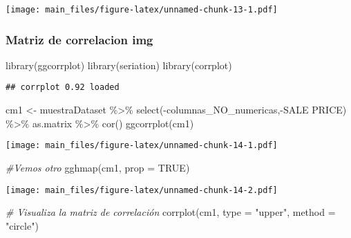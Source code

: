 \documentclass[
]{article}
\newenvironment{Shaded}{\begin{snugshade}}{\end{snugshade}}
\newcommand{\AttributeTok}[1]{\textcolor[rgb]{0.77,0.63,0.00}{#1}}
\newcommand{\CommentTok}[1]{\textcolor[rgb]{0.56,0.35,0.01}{\textit{#1}}}
\newcommand{\ConstantTok}[1]{\textcolor[rgb]{0.00,0.00,0.00}{#1}}
\newcommand{\FunctionTok}[1]{\textcolor[rgb]{0.00,0.00,0.00}{#1}}
\newcommand{\NormalTok}[1]{#1}
\newcommand{\OtherTok}[1]{\textcolor[rgb]{0.56,0.35,0.01}{#1}}
\newcommand{\SpecialCharTok}[1]{\textcolor[rgb]{0.00,0.00,0.00}{#1}}
\newcommand{\StringTok}[1]{\textcolor[rgb]{0.31,0.60,0.02}{#1}}
\begin{document}
\texttt{[image: main\_files/figure-latex/unnamed-chunk-13-1.pdf]}

\hypertarget{matriz-de-correlacion-img}{%
\subsubsection{Matriz de correlacion
img}\label{matriz-de-correlacion-img}}

\begin{Shaded}
\begin{Highlighting}[]
\FunctionTok{library}\NormalTok{(ggcorrplot)}
\FunctionTok{library}\NormalTok{(seriation)}
\FunctionTok{library}\NormalTok{(corrplot)}
\end{Highlighting}
\end{Shaded}

\begin{verbatim}
## corrplot 0.92 loaded
\end{verbatim}

\begin{Shaded}
\begin{Highlighting}[]
\NormalTok{cm1 }\OtherTok{\textless{}{-}}\NormalTok{ muestraDataset }\SpecialCharTok{\%\textgreater{}\%} \FunctionTok{select}\NormalTok{(}\SpecialCharTok{{-}}\NormalTok{columnas\_NO\_numericas,}\SpecialCharTok{{-}}\StringTok{\textasciigrave{}}\AttributeTok{SALE PRICE}\StringTok{\textasciigrave{}}\NormalTok{) }\SpecialCharTok{\%\textgreater{}\%}\NormalTok{ as.matrix }\SpecialCharTok{\%\textgreater{}\%} \FunctionTok{cor}\NormalTok{()}
\FunctionTok{ggcorrplot}\NormalTok{(cm1)}
\end{Highlighting}
\end{Shaded}

\texttt{[image: main\_files/figure-latex/unnamed-chunk-14-1.pdf]}

\begin{Shaded}
\begin{Highlighting}[]
\CommentTok{\#Vemos otro}
\FunctionTok{gghmap}\NormalTok{(cm1, }\AttributeTok{prop =} \ConstantTok{TRUE}\NormalTok{)}
\end{Highlighting}
\end{Shaded}

\texttt{[image: main\_files/figure-latex/unnamed-chunk-14-2.pdf]}

\begin{Shaded}
\begin{Highlighting}[]
\CommentTok{\# Visualiza la matriz de correlación}
\FunctionTok{corrplot}\NormalTok{(cm1, }\AttributeTok{type =} \StringTok{"upper"}\NormalTok{, }\AttributeTok{method =} \StringTok{"circle"}\NormalTok{)}
\end{Highlighting}
\end{Shaded}
\end{document}
